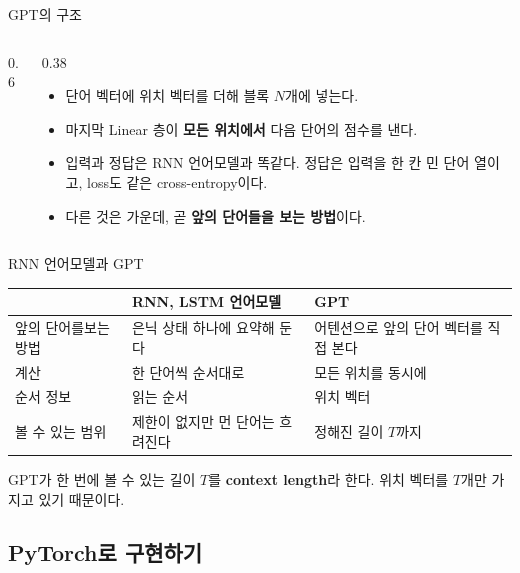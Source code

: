 \documentclass[aspectratio=169,11pt]{beamer}
\begin{document}
\begin{frame}{GPT의 구조}
\begin{columns}[c,onlytextwidth]
\begin{column}{0.6\textwidth}
\end{column}
\begin{column}{0.38\textwidth}
\small
\begin{itemize}
\item 단어 벡터에 위치 벡터를 더해 블록 $N$개에 넣는다.
\item 마지막 Linear 층이 \textbf{모든 위치에서} 다음 단어의 점수를 낸다.
\item 입력과 정답은 RNN 언어모델과 똑같다.
  정답은 입력을 한 칸 민 단어 열이고, loss도 같은 cross-entropy이다.
\item 다른 것은 가운데, 곧 \textbf{앞의 단어들을 보는 방법}이다.
\end{itemize}
\end{column}
\end{columns}
\end{frame}

\begin{frame}{RNN 언어모델과 GPT}
\begin{center}
\small
\begin{tabular}{@{}p{24mm}p{54mm}p{54mm}@{}}
\toprule
& RNN, LSTM 언어모델 & GPT \\
\midrule
앞의 단어를\newline 보는 방법 & 은닉 상태 하나에 요약해 둔다 & 어텐션으로 앞의 단어 벡터를 직접 본다 \\
계산 & 한 단어씩 순서대로 & 모든 위치를 동시에 \\
순서 정보 & 읽는 순서 & 위치 벡터 \\
볼 수 있는 범위 & 제한이 없지만 먼 단어는 흐려진다 & 정해진 길이 $T$까지 \\
\bottomrule
\end{tabular}
\end{center}
\vskip3mm
GPT가 한 번에 볼 수 있는 길이 $T$를 \textbf{context length}라 한다.
위치 벡터를 $T$개만 가지고 있기 때문이다.
\end{frame}

\subsection{PyTorch로 구현하기}
\end{document}
